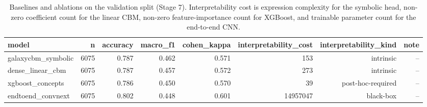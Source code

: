 \begin{table}[t]
\centering
\small
\begin{tabular}{lrrrrrrr}
\toprule
model & n & accuracy & macro\_f1 & cohen\_kappa & interpretability\_cost & interpretability\_kind & note \\
\midrule
galaxycbm\_symbolic & 6075 & 0.787 & 0.462 & 0.571 & 153 & intrinsic & -- \\
dense\_linear\_cbm & 6075 & 0.787 & 0.457 & 0.572 & 273 & intrinsic & -- \\
xgboost\_concepts & 6075 & 0.786 & 0.450 & 0.570 & 39 & post-hoc-required & -- \\
endtoend\_convnext & 6075 & 0.802 & 0.448 & 0.601 & 14957047 & black-box & -- \\
\bottomrule
\end{tabular}
\caption{Baselines and ablations on the validation split (Stage 7). Interpretability cost is expression complexity for the symbolic head, non-zero coefficient count for the linear CBM, non-zero feature-importance count for XGBoost, and trainable parameter count for the end-to-end CNN.}
\label{tab:baselines}
\end{table}
